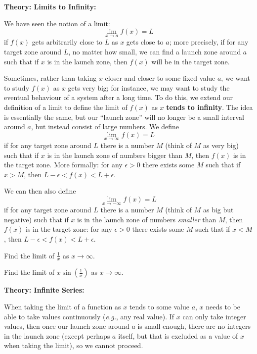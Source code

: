 \documentclass{article}
\begin{document}
\clearpage



\textbf{Theory: Limits to Infinity:}

\vspace{5mm}

We have seen the notion of a limit:
\[\lim_{x\to a}f(x)=L\]
if $f(x)$ gets arbitrarily close to $L$ as $x$ gets close to $a$; more precisely, if for any target zone around $L$, no matter how small, we can find a launch zone around $a$ such that if $x$ is in the launch zone, then $f(x)$ will be in the target zone.

Sometimes, rather than taking $x$ closer and closer to some fixed value $a$, we want to study $f(x)$ as $x$ gets very big; for instance, we may want to study the eventual behaviour of a system after a long time. To do this, we extend our definition of a limit to define the limit of $f(x)$ as $x$ \textbf{tends to infinity}. The idea is essentially the same, but our ``launch zone'' will no longer be a small interval around $a$, but instead consist of large numbers. We define
\[\lim_{x\to \infty}f(x)=L\]
if for any target zone around $L$ there is a number $M$ (think of $M$ as very big) such that if $x$ is in the launch zone of numbers bigger than $M$, then $f(x)$ is in the target zone. More formally:
for any $\epsilon>0$ there exists some $M$ such that if $x>M$, then $L-\epsilon<f(x)<L+\epsilon$.

We can then also define
\[\lim_{x\to -\infty}f(x)=L\]
if for any target zone around $L$ there is a number $M$ (think of $M$ as big but negative) such that if $x$ is in the launch zone of numbers \textit{smaller} than $M$, then $f(x)$ is in the target zone:
for any $\epsilon>0$ there exists some $M$ such that if $x<M$, then $L-\epsilon<f(x)<L+\epsilon$.\bigskip


Find the limit of $\frac{1}{x}$ as $x\to \infty$.

\vfill


Find the limit of $x\sin\left(\frac{1}{x}\right)$ as $x\to \infty$.

\vfill



\clearpage






\textbf{Theory: Infinite Series:}

\vspace{5mm}


When taking the limit of a function as $x$ tends to some value $a$, $x$ needs to be able to take values continuously (\textit{e.g.}, any real value). If $x$ can only take integer values, then once our launch zone around $a$ is small enough, there are no integers in the launch zone (except perhaps $a$ itself, but that is excluded as a value of $x$ when taking the limit), so we cannot proceed.
\end{document}
